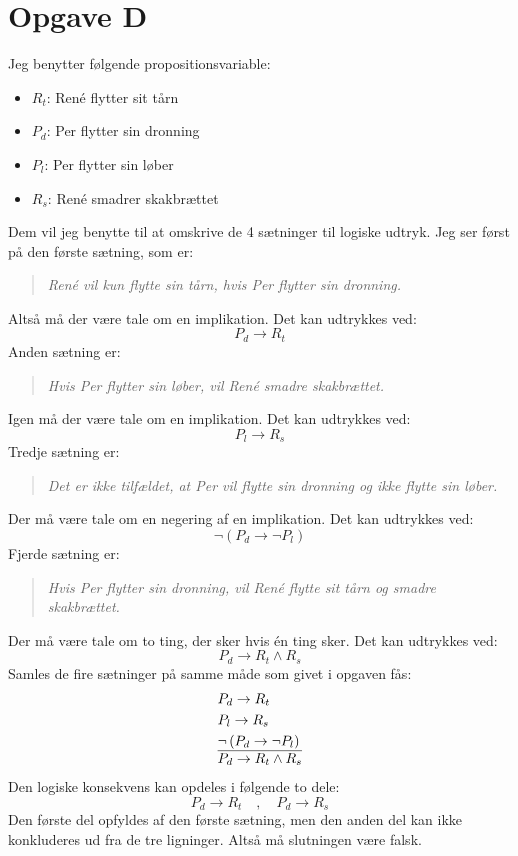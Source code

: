 \section*{Opgave D}
Jeg benytter følgende propositionsvariable:
\begin{itemize}
  \item $R_t$: René flytter sit tårn
  \item $P_d$: Per flytter sin dronning
  \item $P_l$: Per flytter sin løber
  \item $R_s$: René smadrer skakbrættet
\end{itemize}
Dem vil jeg benytte til at omskrive de 4 sætninger til logiske udtryk. Jeg ser først på den første sætning, som er:
\begin{quote}
  \emph{René vil kun flytte sin tårn, hvis Per flytter sin dronning.}
\end{quote}
Altså må der være tale om en implikation. Det kan udtrykkes ved:
\begin{equation}
  P_d \rightarrow R_t
\end{equation}
Anden sætning er:
\begin{quote}
  \emph{Hvis Per flytter sin løber, vil René smadre skakbrættet.}
\end{quote}
Igen må der være tale om en implikation. Det kan udtrykkes ved:
\begin{equation}
  P_l \rightarrow R_s
\end{equation}
Tredje sætning er:
\begin{quote}
  \emph{Det er ikke tilfældet, at Per vil flytte sin dronning og ikke flytte sin løber.}
\end{quote}
Der må være tale om en negering af en implikation. Det kan udtrykkes ved:
\begin{equation}
  \lnot \left( P_d \rightarrow \lnot P_l \right)
\end{equation}
Fjerde sætning er:
\begin{quote}
  \emph{Hvis Per flytter sin dronning, vil René flytte sit tårn og smadre skakbrættet.}
\end{quote}
Der må være tale om to ting, der sker hvis én ting sker. Det kan udtrykkes ved:
\begin{equation}
  \label{D4}
  P_d \rightarrow R_t \land R_s
\end{equation}
Samles de fire sætninger på samme måde som givet i opgaven fås:
\begin{equation}
  \begin{split}
    & P_d \rightarrow R_t\\
    & P_l \rightarrow R_s\\
    & \lnot \left( P_d \rightarrow \lnot P_l \right)\\
    \hline
    & P_d \rightarrow R_t \land R_s
  \end{split}
\end{equation}
Den logiske konsekvens kan opdeles i følgende to dele:
\begin{equation}
  P_d \rightarrow R_t \quad,\quad P_d \rightarrow R_s
\end{equation}
Den første del opfyldes af den første sætning, men den anden del kan ikke konkluderes ud fra de tre ligninger. Altså må slutningen være falsk.